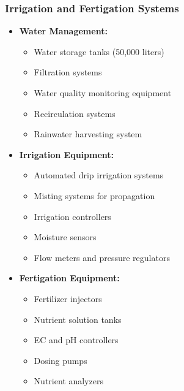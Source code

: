 \subsubsection{Irrigation and Fertigation Systems}
\begin{itemize}
    \item \textbf{Water Management:}
    \begin{itemize}
        \item Water storage tanks (50,000 liters)
        \item Filtration systems
        \item Water quality monitoring equipment
        \item Recirculation systems
        \item Rainwater harvesting system
    \end{itemize}
    
    \item \textbf{Irrigation Equipment:}
    \begin{itemize}
        \item Automated drip irrigation systems
        \item Misting systems for propagation
        \item Irrigation controllers
        \item Moisture sensors
        \item Flow meters and pressure regulators
    \end{itemize}
    
    \item \textbf{Fertigation Equipment:}
    \begin{itemize}
        \item Fertilizer injectors
        \item Nutrient solution tanks
        \item EC and pH controllers
        \item Dosing pumps
        \item Nutrient analyzers
    \end{itemize}
\end{itemize}

